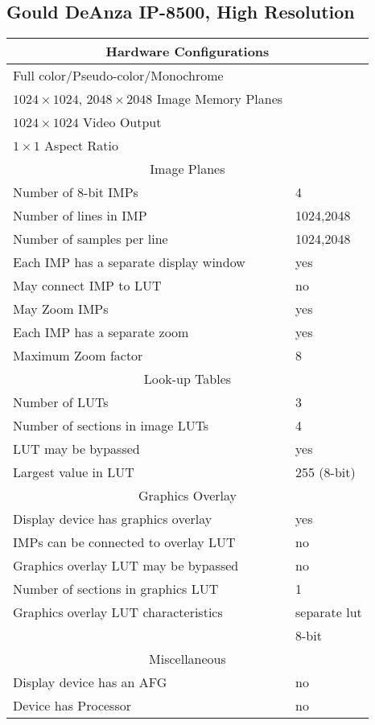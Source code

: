 \subsection{Gould DeAnza IP-8500, High Resolution}
\begin{tabular}{|l l|}
\hline
\multicolumn{2}{|c|}{Hardware Configurations}\\
\hline
Full color/Pseudo-color/Monochrome & \\
$1024 \times 1024$, $2048 \times 2048$ Image Memory Planes & \\
$1024 \times 1024$ Video Output & \\
$1 \times 1$ Aspect Ratio & \\ 
\hline \hline 
\multicolumn{2}{|c|}{Image Planes}\\ \hline
Number of 8-bit IMPs & 4 \\
Number of lines in IMP & 1024,2048\\
Number of samples per line & 1024,2048\\
Each IMP has a separate display window & yes\\
May connect IMP to LUT & no\\
May Zoom IMPs & yes\\
Each IMP has a separate zoom & yes\\
Maximum Zoom factor & 8\\
\hline \hline 
\multicolumn{2}{|c|}{Look-up Tables}\\ 
\hline
Number of LUTs & 3\\
Number of sections in image LUTs & 4\\
LUT may be bypassed & yes\\
Largest value in LUT & 255 (8-bit)\\
\hline \hline 
\multicolumn{2}{|c|}{Graphics Overlay}\\ 
\hline
Display device has graphics overlay & yes\\
IMPs can be connected to overlay LUT & no\\
Graphics overlay LUT may be bypassed & no\\
Number of sections in graphics LUT & 1\\
Graphics overlay LUT characteristics & separate lut\\
& 8-bit\\
\hline \hline 
\multicolumn{2}{|c|}{Miscellaneous}\\ 
\hline
Display device has an AFG & no \\
Device has Processor & no\\ \hline
\end{tabular}
